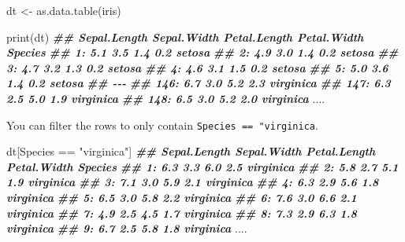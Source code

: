 \documentclass[
]{book}
\newenvironment{Shaded}{\begin{snugshade}}{\end{snugshade}}
\newcommand{\DocumentationTok}[1]{\textcolor[rgb]{0.56,0.35,0.01}{\textbf{\textit{#1}}}}
\newcommand{\FunctionTok}[1]{\textcolor[rgb]{0.00,0.00,0.00}{#1}}
\newcommand{\NormalTok}[1]{#1}
\newcommand{\OtherTok}[1]{\textcolor[rgb]{0.56,0.35,0.01}{#1}}
\newcommand{\SpecialCharTok}[1]{\textcolor[rgb]{0.00,0.00,0.00}{#1}}
\newcommand{\StringTok}[1]{\textcolor[rgb]{0.31,0.60,0.02}{#1}}
\begin{document}
\begin{Shaded}
\begin{Highlighting}[]
\NormalTok{dt }\OtherTok{\textless{}{-}} \FunctionTok{as.data.table}\NormalTok{(iris)}

\FunctionTok{print}\NormalTok{(dt)}
\DocumentationTok{\#\#      Sepal.Length Sepal.Width Petal.Length Petal.Width   Species}
\DocumentationTok{\#\#   1:          5.1         3.5          1.4         0.2    setosa}
\DocumentationTok{\#\#   2:          4.9         3.0          1.4         0.2    setosa}
\DocumentationTok{\#\#   3:          4.7         3.2          1.3         0.2    setosa}
\DocumentationTok{\#\#   4:          4.6         3.1          1.5         0.2    setosa}
\DocumentationTok{\#\#   5:          5.0         3.6          1.4         0.2    setosa}
\DocumentationTok{\#\#  {-}{-}{-}                                                            }
\DocumentationTok{\#\# 146:          6.7         3.0          5.2         2.3 virginica}
\DocumentationTok{\#\# 147:          6.3         2.5          5.0         1.9 virginica}
\DocumentationTok{\#\# 148:          6.5         3.0          5.2         2.0 virginica}
\NormalTok{....}
\end{Highlighting}
\end{Shaded}

You can filter the rows to only contain \texttt{Species\ ==\ "virginica}.

\begin{Shaded}
\begin{Highlighting}[]
\NormalTok{dt[Species }\SpecialCharTok{==} \StringTok{"virginica"}\NormalTok{]}
\DocumentationTok{\#\#     Sepal.Length Sepal.Width Petal.Length Petal.Width   Species}
\DocumentationTok{\#\#  1:          6.3         3.3          6.0         2.5 virginica}
\DocumentationTok{\#\#  2:          5.8         2.7          5.1         1.9 virginica}
\DocumentationTok{\#\#  3:          7.1         3.0          5.9         2.1 virginica}
\DocumentationTok{\#\#  4:          6.3         2.9          5.6         1.8 virginica}
\DocumentationTok{\#\#  5:          6.5         3.0          5.8         2.2 virginica}
\DocumentationTok{\#\#  6:          7.6         3.0          6.6         2.1 virginica}
\DocumentationTok{\#\#  7:          4.9         2.5          4.5         1.7 virginica}
\DocumentationTok{\#\#  8:          7.3         2.9          6.3         1.8 virginica}
\DocumentationTok{\#\#  9:          6.7         2.5          5.8         1.8 virginica}
\NormalTok{....}
\end{Highlighting}
\end{Shaded}
\end{document}
